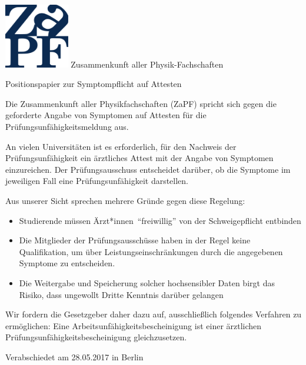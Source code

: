 \documentclass[DIV=calc]{scrartcl}
\newcommand{\gen}{*innen}
\begin{document}
    \hspace{0.87\textwidth}
    \begin{minipage}{120pt}
        \vspace{-1.8cm}
        \includegraphics[width=80pt]{logo.pdf}
        \centering
        \small Zusammenkunft aller Physik-Fachschaften
    \end{minipage}
    \begin{center}
        \huge{Positionspapier zur Symptompflicht auf Attesten} \\
        \normalsize
    \end{center}
    \vspace{1cm}    
Die Zusammenkunft aller Physikfachschaften (ZaPF) spricht sich gegen  die geforderte Angabe von Symptomen auf Attesten für die Prüfungsunfähigkeitsmeldung aus. 

An vielen Universitäten ist es erforderlich, für den Nachweis der Prüfungsunfähigkeit ein ärztliches Attest mit der Angabe von Symptomen einzureichen. Der Prüfungsausschuss entscheidet darüber, ob die Symptome im jeweiligen Fall eine Prüfungsunfähigkeit darstellen. 

Aus unserer Sicht sprechen mehrere Gründe gegen diese Regelung: 
\begin{itemize}
\item Studierende müssen Ärzt\gen\ "`freiwillig"' von der Schweigepflicht entbinden 
\item Die Mitglieder der Prüfungsausschüsse haben in der Regel keine Qualifikation, um über Leistungseinschränkungen durch die angegebenen Symptome zu entscheiden. 
\item Die Weitergabe und Speicherung solcher hochsensibler Daten birgt das Risiko, dass ungewollt Dritte Kenntnis darüber gelangen 
\end{itemize}

Wir fordern die Gesetzgeber daher dazu auf, ausschließlich folgendes Verfahren zu ermöglichen: 
Eine Arbeitsunfähigkeitsbescheinigung ist einer ärztlichen Prüfungsunfähigkeitsbescheinigung gleichzusetzen.
\vfill
    \begin{flushright}
        Verabschiedet am 28.05.2017 in Berlin
    \end{flushright}
\end{document}
